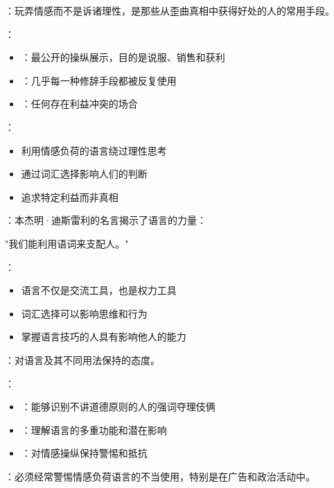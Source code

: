 \begin{theorembox}[title=情感操纵的识别与防范]
：玩弄情感而不是诉诸理性，是那些从歪曲真相中获得好处的人的常用手段。

：
\begin{itemize}
  \item {}：最公开的操纵展示，目的是说服、销售和获利
  \item {}：几乎每一种修辞手段都被反复使用
  \item {}：任何存在利益冲突的场合
\end{itemize}

：
\begin{itemize}
  \item 利用情感负荷的语言绕过理性思考
  \item 通过词汇选择影响人们的判断
  \item 追求特定利益而非真相
\end{itemize}
\end{theorembox}

\begin{theorembox}[title=语言权力的认识]
：本杰明·迪斯雷利的名言揭示了语言的力量：

\begin{displayquote}
"我们能利用语词来支配人。"
\end{displayquote}

：
\begin{itemize}
  \item 语言不仅是交流工具，也是权力工具
  \item 词汇选择可以影响思维和行为
  \item 掌握语言技巧的人具有影响他人的能力
\end{itemize}
\end{theorembox}

\begin{theorembox}[title=防御策略]
：对语言及其不同用法保持的态度。

：
\begin{itemize}
  \item {}：能够识别不讲道德原则的人的强词夺理伎俩
  \item {}：理解语言的多重功能和潜在影响
  \item {}：对情感操纵保持警惕和抵抗
\end{itemize}

：必须经常警惕情感负荷语言的不当使用，特别是在广告和政治活动中。
\end{theorembox}

